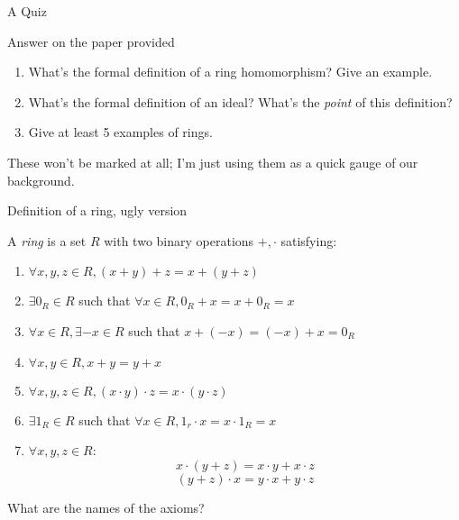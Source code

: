 \documentclass{beamer}
\begin{document}
\begin{frame}[plain,c]

\begin{center}

\Huge

A Quiz
\end{center}

\end{frame}



\begin{frame}{Answer on the paper provided}

\begin{enumerate}
\item What's the formal definition of a ring homomorphism?  Give an example.
\item What's the formal definition of an ideal?  What's the \emph{point} of this definition?
\item Give at least 5 examples of rings.
\end{enumerate}

These won't be marked at all; I'm just using them as a quick gauge of our background.

\end{frame}

\begin{frame}{Definition of a ring, ugly version}

A \emph{ring} is a set $R$ with two binary operations $+, \cdot$ satisfying:

\begin{enumerate}
\item $\forall x, y,z\in R, (x+y)+z=x+(y+z)$
\item $\exists 0_R\in R$ such that $\forall x\in R,  0_R+x=x+0_R=x$
\item $\forall x\in R, \exists {-x}\in R$ such that $x+({-x})=({-x})+x=0_R$
\item $\forall x,y \in R, x+y=y+x$
\item $\forall x, y,z\in R, (x\cdot y)\cdot z=x\cdot (y\cdot z)$
\item $\exists 1_R\in R$ such that $\forall x\in R, 1_r\cdot x=x\cdot 1_R=x$
\item $\forall x, y,z\in R$:
$$x\cdot (y+z)=x\cdot y+x\cdot z$$ 
$$(y+z)\cdot x=y\cdot x+ y\cdot z$$
\end{enumerate}

\begin{block}{What are the names of the axioms?}\end{block}

\end{frame}
\end{document}
